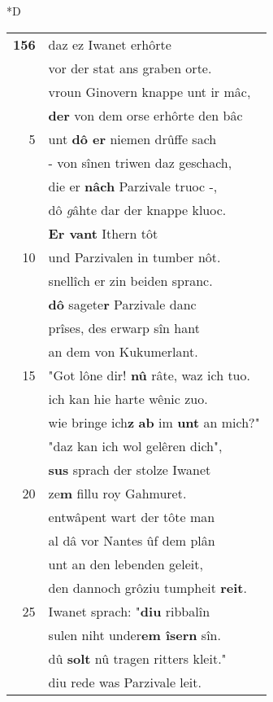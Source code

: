 \documentclass[8pt,a4paper,notitlepage]{article}
\begin{document}
\begin{table}[ht]
\begin{minipage}[t]{0.5\linewidth}
\small
\begin{center}*D
\end{center}
\begin{tabular}{rl}
\textbf{156} & daz ez Iwanet erhôrte\\ 
 & vor der stat ans graben orte.\\ 
 & vroun Ginovern knappe unt ir mâc,\\ 
 & \textbf{der} von dem orse erhôrte den bâc\\ 
5 & unt \textbf{dô er} niemen drûffe sach\\ 
 & - von sînen triwen daz geschach,\\ 
 & die er \textbf{nâch} Parzivale truoc -,\\ 
 & dô \textit{g}âhte dar der knappe kluoc.\\ 
 & \textbf{Er vant} Ithern tôt\\ 
10 & und Parzivalen in tumber nôt.\\ 
 & snellîch er zin beiden spranc.\\ 
 & \textbf{dô} sagete\textbf{r} Parzivale danc\\ 
 & prîses, des erwarp sîn hant\\ 
 & an dem von Kukumerlant.\\ 
15 & "Got lône dir! \textbf{nû} râte, waz ich tuo.\\ 
 & ich kan hie harte wênic zuo.\\ 
 & wie bringe ich\textbf{z} \textbf{ab} im \textbf{unt} an mich?"\\ 
 & "daz kan ich wol gelêren dich",\\ 
 & \textbf{sus} sprach der stolze Iwanet\\ 
20 & ze\textbf{m} fillu roy Gahmuret.\\ 
 & entwâpent wart der tôte man\\ 
 & al dâ vor Nantes ûf dem plân\\ 
 & unt an den lebenden geleit,\\ 
 & den dannoch grôziu tumpheit \textbf{reit}.\\ 
25 & Iwanet sprach: "\textbf{diu} ribbalîn\\ 
 & sulen niht under\textbf{em îsern} sîn.\\ 
 & dû \textbf{solt} nû tragen ritters kleit."\\ 
 & diu rede was Parzivale leit.\\ 

\end{tabular}
\end{minipage}
\end{table}
\end{document}
